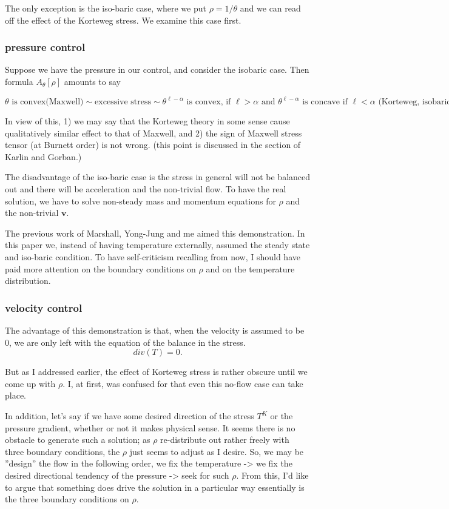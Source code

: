 \documentclass[a4paper,12pt]{article}
\begin{document}
The only exception is the iso-baric case, where we put $\rho = 1/\theta$ and we can read off the effect of the Korteweg stress. We examine this case first.

\subsubsection{pressure control}
Suppose we have the pressure in our control, and consider the isobaric case. Then formula {{{$A_\theta[\rho]$}}} amounts to say

{{{ $$ \text{$\theta$ is convex(Maxwell)} \sim \text{excessive stress} \sim  \text{$\theta^{\ell-\alpha}$ is convex, if $\ell>\alpha$ and $\theta^{\ell-\alpha}$ is concave if $\ell<\alpha$  (Korteweg, isobaric)} $$}}}

In view of this, 1) we may say that the Korteweg theory in some sense cause qualitatively similar effect to that of Maxwell, and 2) the sign of Maxwell stress tensor (at Burnett order) is not wrong. (this point is discussed in the section of Karlin and Gorban.)

The disadvantage of the iso-baric case is the stress in general will not be balanced out and there will be acceleration and the non-trivial flow. To have the real solution, we have to solve non-steady mass and momentum equations for $\rho$ and the non-trivial $\mathbf{v}$.

The previous work of Marshall, Yong-Jung and me aimed this demonstration. In this paper we, instead of having temperature externally, assumed the steady state and iso-baric condition. To have self-criticism recalling from now, I should have paid more attention on the boundary conditions on $\rho$ and on the temperature distribution.

\subsubsection{velocity control}
The advantage of this demonstration is that, when the velocity is assumed to be 0, we are only left with the equation of the balance in the stress. $$ div(T) = 0. $$

But as I addressed earlier, the effect of Korteweg stress is rather obscure until we come up with $\rho$. I, at first, was confused for that even this no-flow case can take place.

In addition, let's say if we have some desired direction of the stress {{{$T^K$}}} or the pressure gradient, whether or not it makes physical sense. It seems there is no obstacle to generate such a solution; as $\rho$ re-distribute out rather freely with three boundary conditions, the $\rho$ just seems to adjust as I desire. So, we may be ''design'' the flow in the following order, we fix the temperature -> we fix the desired directional tendency of the pressure -> seek for such $\rho$. From this, I'd like to argue that something does drive the solution in a particular way essentially is the three boundary conditions on $\rho$.
\end{document}

